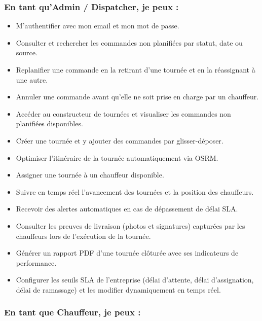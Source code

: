 \subsubsection*{En tant qu'Admin / Dispatcher, je peux :}

\begin{itemize}
  \item M'authentifier avec mon email et mon mot de passe.
  \item Consulter et rechercher les commandes non planifiées par statut, date ou source.
  \item Replanifier une commande en la retirant d'une tournée et en la réassignant
        à une autre.
  \item Annuler une commande avant qu'elle ne soit prise en charge par un chauffeur.
  \item Accéder au constructeur de tournées et visualiser les commandes non planifiées
        disponibles.
  \item Créer une tournée et y ajouter des commandes par glisser-déposer.
  \item Optimiser l'itinéraire de la tournée automatiquement via OSRM.
  \item Assigner une tournée à un chauffeur disponible.
  \item Suivre en temps réel l'avancement des tournées et la position des chauffeurs.
  \item Recevoir des alertes automatiques en cas de dépassement de délai SLA.
  \item Consulter les preuves de livraison (photos et signatures) capturées par
        les chauffeurs lors de l'exécution de la tournée.
  \item Générer un rapport PDF d'une tournée clôturée avec ses indicateurs de performance.
  \item Configurer les seuils SLA de l'entreprise (délai d'attente, délai d'assignation,
        délai de ramassage) et les modifier dynamiquement en temps réel.
\end{itemize}

\subsubsection*{En tant que Chauffeur, je peux :}

